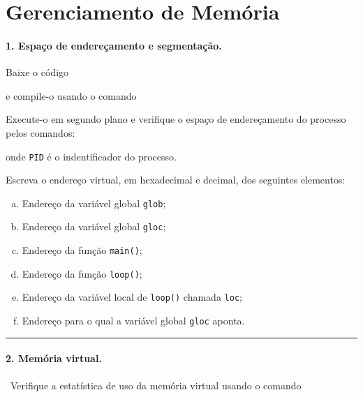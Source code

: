 \maketitle

\warning

\section*{Gerenciamento de Memória}

\paragraph{1.  Espaço de endereçamento e segmentação.} Baixe o código 

\bigskip


\noindent e compile-o usando o comando

\bigskip


\noindent Execute-o em segundo plano e verifique o espaço de
endereçamento do processo pelos comandos:

\bigskip


\noindent onde {\tt PID} é o indentificador do processo.

\noindent Escreva o endereço virtual, em hexadecimal e decimal, dos
seguintes elementos:

\begin{enumerate}[a)]
\item Endereço da variável global {\tt glob};
\item Endereço da variável global {\tt gloc};
\item Endereço da função {\tt main()};
\item Endereço da função {\tt loop()};
\item Endereço da variável local de {\tt loop()} chamada {\tt loc};
\item Endereço para o qual a variável global {\tt gloc} aponta.
\end{enumerate}

\hrule

\paragraph{2. Memória virtual.}~Verifique a estatística de uso da memória virtual
usando o comando 

